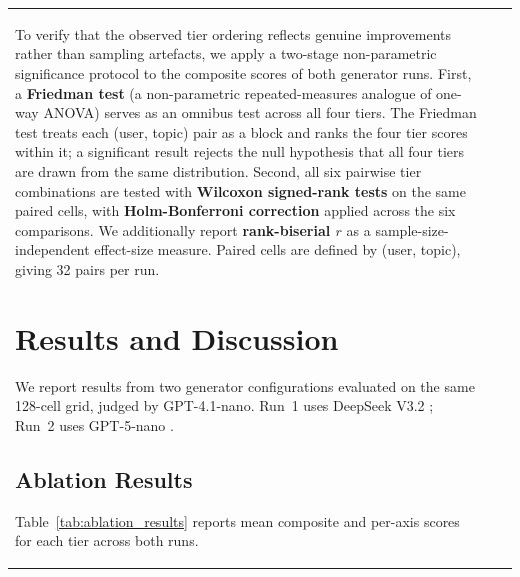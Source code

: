 \documentclass[conference]{IEEEtran}
\begin{document}
\begin{table}[htbp]
\begin{center}
\begin{tabular}{lll}
To verify that the observed tier ordering reflects genuine improvements rather than sampling artefacts, we apply a two-stage non-parametric significance protocol to the composite scores of both generator runs. First, a \textbf{Friedman test} (a non-parametric repeated-measures analogue of one-way ANOVA) serves as an omnibus test across all four tiers. The Friedman test treats each (user, topic) pair as a block and ranks the four tier scores within it; a significant result rejects the null hypothesis that all four tiers are drawn from the same distribution. Second, all six pairwise tier combinations are tested with \textbf{Wilcoxon signed-rank tests} on the same paired cells, with \textbf{Holm-Bonferroni correction} applied across the six comparisons. We additionally report \textbf{rank-biserial $r$} as a sample-size-independent effect-size measure. Paired cells are defined by (user, topic), giving 32 pairs per run.

\section{Results and Discussion}
\label{sec:results}

We report results from two generator configurations evaluated on the same 128-cell grid, judged by GPT-4.1-nano. Run~1 uses DeepSeek V3.2 \cite{b14}; Run~2 uses GPT-5-nano \cite{b15}.

\subsection{Ablation Results}

Table~\ref{tab:ablation_results} reports mean composite and per-axis scores for each tier across both runs.


\end{tabular}
\end{center}
\end{table}
\end{document}
